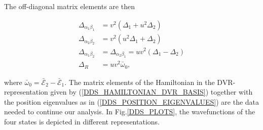 \documentclass[preprint]{revtex4-2}
\begin{document}
The off-diagonal matrix elements are then 

\begin{equation}
\begin{split}
    \Delta_{\alpha_1\beta_1} &= v^2(\Delta_1+u^2\Delta_2) \\
    \Delta_{\alpha_2\beta_2} &= v^2(u^2\Delta_1+\Delta_2) \\
    \Delta_{\alpha_1\beta_2} &= \Delta_{\alpha_2\beta_1} = uv^2(\Delta_1-\Delta_2) \\
    \Delta_R &= uv^2\bar{\omega}_0, 
\end{split}
\end{equation}

where $\bar{\omega}_0=\bar{\mathcal{E}}_2-\bar{\mathcal{E}}_1$. The matrix elements of the 
Hamiltonian in the DVR-representation given by (\ref{DDS_HAMILTONIAN_DVR_BASIS}) together with
the position eigenvalues as in (\ref{DDS_POSITION_EIGENVALUES}) are the data needed to continue our
analysis. In Fig.\ref{DDS_PLOTS}, the wavefunctions of the four states is depicted in different 
representations.
\end{document}
